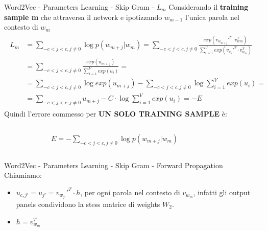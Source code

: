\documentclass[british]{beamer}
\begin{document}
\begin{frame}{Word2Vec - Parameters Learning - Skip Gram - \(L_m\)}
	Considerando il \textbf{training sample m} che attraversa il network e ipotizzando \(w_{m-1}\) l'unica parola nel contesto di \(w_{m}\)
	\begin{gather*}
		\begin{split}
		L_m &= \sum_{-c<j<c,j\neq0}\log p(w_{m+j}|w_{m}) =
		\sum_{-c<j<c,j\neq0} \frac{exp(v_{w_{m+j}}'^T \cdot v_{w{m}}^T)}{\sum_{i=1}^{V} exp(v_{w_{i}}'^T \cdot v_{w_{m}}^T)} 
		\\
		&= \sum_{-c<j<c,j\neq0} \frac{exp(u_{m+j})}{\sum_{i=1}^{V} exp(u_i)} = 
		\\
		&= \sum_{-c<j<c,j\neq0} \log exp(u_{m+j}) - \sum_{-c<j<c,j\neq0} \log \sum_{i=1}^{V} exp(u_i) =
		\\
		&= \sum_{-c<j<c,j\neq0} u_{m+j} - C \cdot \log \sum_{i=1}^{V} exp(u_i) = -E
		\end{split}
	\end{gather*}
	Quindi l'errore commesso per \textbf{UN SOLO TRAINING SAMPLE} \`{e}:
	\begin{columns}
		\begin{column}{0.2\textwidth}
			
		\end{column}
		\begin{column}{0.6\textwidth}
			\(E = - \sum_{-c<j<c,j\neq0}\log p(w_{m+j}|w_{m})\)
		\end{column}
		\begin{column}{0.2\textwidth}
			
		\end{column}
	\end{columns}
\end{frame}

\begin{frame}{Word2Vec - Parameters Learning - Skip Gram - Forward Propagation}
	Chiamiamo:
	\begin{itemize}
		\item \(u_{c,j'} = u_{j'} = v_{w_{j'}}'^T \cdot h \), per ogni parola nel contesto di \(v_{w_{m}}\), infatti gli output panels condividono la stess matrice di weights \(W_2\).
		\item \(h = v_{w_{m}}^T\)
	\end{itemize} 
\end{frame}
\end{document}
